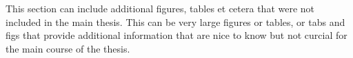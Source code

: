 
This section can include additional figures, tables et cetera that were not included in the main thesis. This can be very large figures or tables, or tabs and figs that provide additional information that are nice to know but not curcial for the main course of the thesis.